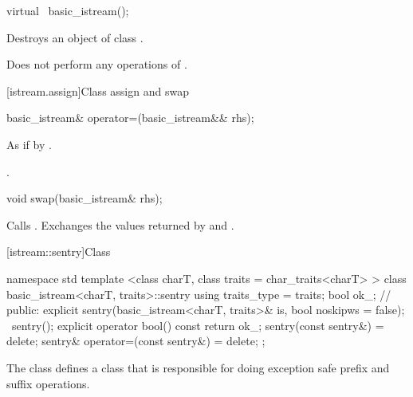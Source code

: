 %
\begin{itemdecl}
virtual ~basic_istream();
\end{itemdecl}

\begin{itemdescr}
\pnum
\effects
Destroys an object of class
.

\pnum
\remarks
Does not perform any operations of
.
\end{itemdescr}

[istream.assign]{Class  assign and swap}

%
%
\begin{itemdecl}
basic_istream& operator=(basic_istream&& rhs);
\end{itemdecl}

\begin{itemdescr}
\pnum
\effects As if by .

\pnum
\returns {}.
\end{itemdescr}

%
%
\begin{itemdecl}
void swap(basic_istream& rhs);
\end{itemdecl}

\begin{itemdescr}
\pnum
\effects Calls .
Exchanges the values returned by  and
.
\end{itemdescr}

[istream::sentry]{Class }

%
\begin{codeblock}
namespace std {
  template <class charT, class traits = char_traits<charT> >
  class basic_istream<charT, traits>::sentry {
    using traits_type = traits;
    bool ok_; // \expos
  public:
    explicit sentry(basic_istream<charT, traits>& is, bool noskipws = false);
    ~sentry();
    explicit operator bool() const { return ok_; }
    sentry(const sentry&) = delete;
    sentry& operator=(const sentry&) = delete;
  };
}
\end{codeblock}

\begin{itemdescr}
\pnum
The class
defines a class that is responsible for doing exception safe prefix and suffix
operations.
\end{itemdescr}

